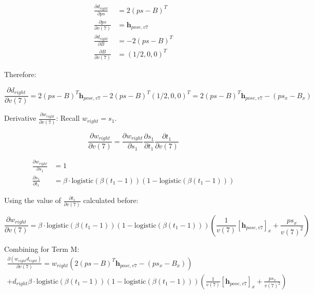 \documentclass[11pt]{article}
\begin{document}
                \begin{align}
                    \frac{\partial d_{right}}{\partial ps} &= 2(ps - B)^T \\
                    \frac{\partial ps}{\partial v(7)} &= \mathbf{h}_{pose,v7} \\
                    \frac{\partial d_{right}}{\partial B} &= -2(ps - B)^T \\
                    \frac{\partial B}{\partial v(7)} &= (1/2, 0, 0)^T
                \end{align}

                Therefore:

                \begin{equation}
                    \frac{\partial d_{right}}{\partial v(7)} = 2(ps - B)^T \mathbf{h}_{pose,v7}  -2(ps - B)^T (1/2, 0, 0)^T =  2(ps - B)^T \mathbf{h}_{pose,v7}  - (ps_x - B_x)
                \end{equation}

                Derivative $\frac{\partial w_{right}}{\partial v(7)}$:
                Recall $w_{right} = s_1$.

                \begin{equation}
                    \frac{\partial w_{right}}{\partial v(7)} = \frac{\partial w_{right}}{\partial s_1} \frac{\partial s_1}{\partial t_1} \frac{\partial t_1}{\partial v(7)}
                \end{equation}

                \begin{align}
                    \frac{\partial w_{right}}{\partial s_1} &= 1 \\
                    \frac{\partial s_1}{\partial t_1} &= \beta \cdot \text{logistic}(\beta (t_1 -1)) (1 - \text{logistic}(\beta (t_1-1)))
                \end{align}

                Using the value of $\frac{\partial t_1}{\partial v(7)}$ calculated before:

                \begin{equation}
                    \frac{\partial w_{right}}{\partial v(7)} = \beta \cdot \text{logistic}(\beta (t_1 - 1))(1 - \text{logistic}(\beta (t_1 - 1))) \left( \frac{1}{v(7)}[\mathbf{h}_{pose,v7}]_x + \frac{ps_{x}}{v(7)^2} \right)
                \end{equation}

                Combining for Term M:
                \begin{multline}
                    \frac{\partial (w_{right} d_{right})}{\partial v(7)} = w_{right} \left( 2(ps - B)^T \mathbf{h}_{pose,v7}  - (ps_x - B_x) \right) \\ + d_{right}\beta \cdot \text{logistic}(\beta (t_1 - 1))(1 - \text{logistic}(\beta (t_1-1))) \left( \frac{1}{v(7)}[\mathbf{h}_{pose,v7}]_x + \frac{ps_{x}}{v(7)^2} \right)
                \end{multline}
\end{document}
